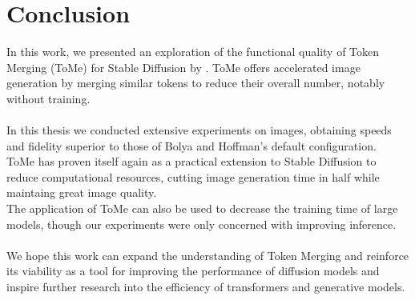 \section{Conclusion}
In this work, we presented an exploration of the functional quality of Token Merging (ToMe) for Stable Diffusion by \cite{bolya2023tomesd}. ToMe offers accelerated image generation by merging similar tokens to reduce their overall number, notably without training.\\
\\
In this thesis we conducted extensive experiments on images, obtaining speeds and fidelity superior to those of Bolya and Hoffman's default configuration.\\
ToMe has proven itself again as a practical extension to Stable Diffusion to reduce computational resources, cutting image generation time in half while maintaing great image quality.\\
The application of ToMe can also be used to decrease the training time of large models, though our experiments were only concerned with improving inference.\\
\\
We hope this work can expand the understanding of Token Merging and reinforce its viability as a tool for improving the performance of diffusion models and inspire further research into the efficiency of transformers and generative models.
